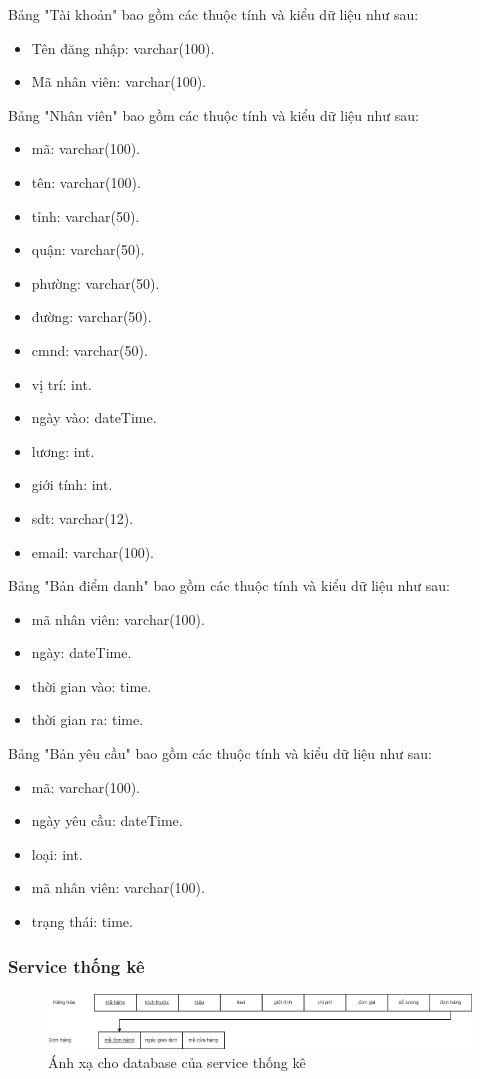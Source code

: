 Bảng "Tài khoản" bao gồm các thuộc tính và kiểu dữ liệu như sau:
\begin{itemize}
	\item Tên đăng nhập: varchar(100).
	\item Mã nhân viên: varchar(100).
\end{itemize}

Bảng "Nhân viên" bao gồm các thuộc tính và kiểu dữ liệu như sau:
\begin{itemize}
	\item mã: varchar(100).
	\item tên: varchar(100).
	\item tỉnh: varchar(50).
	\item quận: varchar(50).
	\item phường: varchar(50).
	\item đường: varchar(50).
	\item cmnd: varchar(50).
	\item vị trí: int.
	\item ngày vào: dateTime.
	\item lương: int.
	\item giới tính: int. 
	\item sdt: varchar(12).  
	\item email: varchar(100). 
\end{itemize}

Bảng "Bản điểm danh" bao gồm các thuộc tính và kiểu dữ liệu như sau:
\begin{itemize}
	\item mã nhân viên: varchar(100).
	\item ngày: dateTime.
	\item thời gian vào: time.
	\item thời gian ra: time.
\end{itemize}

Bảng "Bản yêu cầu" bao gồm các thuộc tính và kiểu dữ liệu như sau:
\begin{itemize}
	\item mã: varchar(100).
	\item ngày yêu cầu: dateTime.
	\item loại: int.
	\item mã nhân viên: varchar(100).
	\item trạng thái: time.
\end{itemize}


\subsubsection{Service thống kê}
\begin{figure}[!htp]
	\begin{center}
		\includegraphics[width=1\textwidth]{img/database/mapping/Statistic.png}
		\newline
		\caption{Ánh xạ cho database của service thống kê}
	\end{center}
\end{figure}

